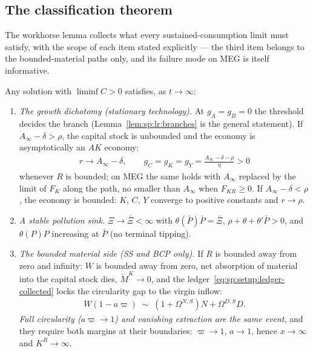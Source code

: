 \subsection{The classification theorem}\label{sec:sp:longrun:classification}

The workhorse lemma collects what every sustained-consumption limit must satisfy, with the
scope of each item stated explicitly --- the third item belongs to the bounded-material paths
only, and its failure mode on MEG is itself informative.

\begin{lemma}\label{lem:sp:lr:common}
Any solution with $\liminf C>0$ satisfies, as $t\to\infty$:
\begin{enumerate}
    \item \emph{The growth dichotomy (stationary technology).} At $g_A=g_B=0$ the threshold
    decides the branch (Lemma~\ref{lem:sp:lr:branches} is the general statement). If
    $A_\infty-\delta>\rho$, the capital stock is unbounded and the economy is asymptotically an
    $AK$ economy:
    \begin{align}
    r\to A_\infty-\delta,
    \qquad
    g_C=g_K=g_Y=\frac{A_\infty-\delta-\rho}{\eta}>0
    \label{eq:sp:lr:gC}
    \end{align}
    whenever $R$ is bounded; on MEG the same holds with $A_\infty$ replaced by the limit of
    $F_K$ along the path, no smaller than $A_\infty$ when $F_{KR}\ge0$. If $A_\infty-\delta<\rho$, the economy is bounded: $K$, $C$,
    $Y$ converge to positive constants and $r\to\rho$.
    \item \emph{A stable pollution sink.} $\Xi\to\bar\Xi<\infty$ with
    $\theta\left(\bar P\right)\bar P=\bar\Xi$, $\rho+\theta+\theta'\bar P>0$, and
    $\theta\left(P\right)P$ increasing at $\bar P$ (no terminal tipping).
    \item \emph{The bounded material side (SS and BCP only).} If $R$ is bounded away from zero
    and infinity: $W$ is bounded away from zero, net absorption of material into the capital
    stock dies, $\dot M^K\to0$, and the ledger~\eqref{eq:sp:setup:ledger-collected} locks the
    circularity gap to the virgin inflow:
    \begin{align}
    W\left(1-a\varpi\right)\;\sim\;\left(1+\Omega^{N,S}\right)N+\Omega^{D,S}D .
    \label{eq:sp:lr:ratelock}
    \end{align}
    \emph{Full circularity ($a\varpi\to1$) and vanishing extraction are the same event}, and
    they require both margins at their boundaries: $\varpi\to1$, $a\to1$, hence $x\to\infty$
    and $K^R\to\infty$.
\end{enumerate}
\end{lemma}

